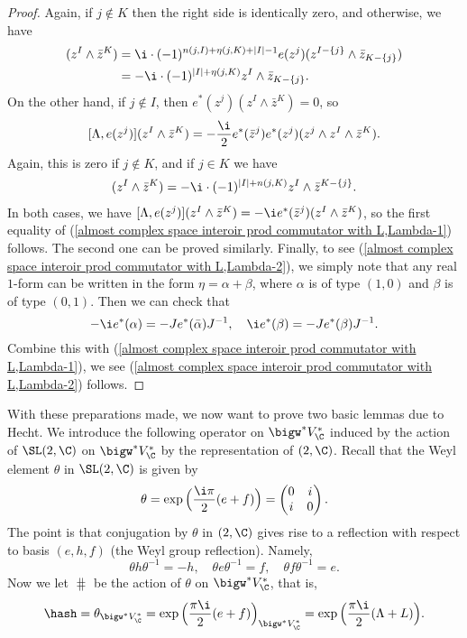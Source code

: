 \begin{proof}
Again, if $j\notin K$ then the right side is identically zero, and otherwise, we have
\begin{align*}
[\Lambda,e(z^j)](z^I\wedge\bar{z}^K)&=\i\cdot(-1)^{n(j,I)+\eta(j,K)+|I|-1}e(z^j)(z^{I-\{j\}}\wedge\bar{z}_{K-\{j\}})\\
&=-\i\cdot(-1)^{|I|+\eta(j,K)}z^I\wedge\bar{z}_{K-\{j\}}.
\end{align*}
On the other hand, if $j\notin I$, then $e^*(z^j)(z^I\wedge\bar{z}^K)=0$, so
\[[\Lambda,e(z^j)](z^I\wedge\bar{z}^K)=-\frac{\i}{2}e^*(\bar{z}^j)e^*(z^j)(z^j\wedge z^I\wedge\bar{z}^K).\]
Again, this is zero if $j\notin K$, and if $j\in K$ we have
\begin{align*}
[\Lambda,e(z^j)](z^I\wedge\bar{z}^K)=-\i\cdot(-1)^{|I|+n(j,K)}z^I\wedge\bar{z}^{K-\{j\}}.
\end{align*}
In both cases, we have $[\Lambda,e(z^j)](z^I\wedge\bar{z}^K)=-\i e^*(\bar{z}^j)(z^I\wedge\bar{z}^K)$, so the first equality of (\ref{almost complex space interoir prod commutator with L,Lambda-1}) follows. The second one can be proved similarly. Finally, to see (\ref{almost complex space interoir prod commutator with L,Lambda-2}), we simply note that any real $1$-form can be written in the form $\eta=\alpha+\beta$, where $\alpha$ is of type $(1,0)$ and $\beta$ is of type $(0,1)$. Then we can check that
\[-\i e^*(\alpha)=-Je^*(\bar{\alpha})J^{-1},\quad \i e^*(\beta)=-Je^*(\beta)J^{-1}.\]
Combine this with (\ref{almost complex space interoir prod commutator with L,Lambda-1}), we see (\ref{almost complex space interoir prod commutator with L,Lambda-2}) follows.
\end{proof}
With these preparations made, we now want to prove two basic lemmas due to Hecht. We introduce the following operator on $\bigw^*V^*_{\C}$ induced by the action of $\SL(2,\C)$ on $\bigw^*V^*_{\C}$ by the representation of $\sl(2,\C)$. Recall that the Weyl element $\theta$ in $\SL(2,\C)$ is given by
\[\theta=\exp\Big(\frac{\i\pi}{2}(e+f)\Big)=\begin{pmatrix}
0&i\\
i&0
\end{pmatrix}.\]
The point is that conjugation by $\theta$ in $\sl(2,\C)$ gives rise to a reflection with respect to basis $(e,h,f)$ (the Weyl group reflection). Namely,
\[\theta h\theta^{-1}=-h,\quad \theta e\theta^{-1}=f,\quad \theta f\theta^{-1}=e.\]
Now we let $\hash$ be the action of $\theta$ on $\bigw^*V^*_{\C}$, that is,
\[\hash=\theta_{\bigw^*V^*_{\C}}=\exp\Big(\frac{\pi\i}{2}(e+f)\Big)_{\bigw^*V^*_{\C}}=\exp\Big(\frac{\pi\i}{2}(\Lambda+L)\Big).\]
